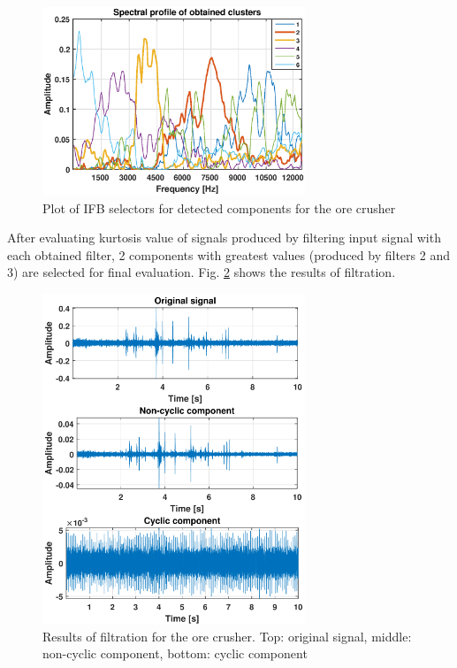 \documentclass[preprint,12pt]{elsarticle}
\begin{document}
\begin{figure}[!ht]
\centering
\includegraphics[width = 0.7\textwidth]{figs3/filt.eps}
\caption{Plot of IFB selectors for detected components for the ore crusher}
\label{fig: filt2}
\end{figure}

After evaluating kurtosis value of signals produced by filtering input signal with each obtained filter, 2 components with greatest values (produced by filters 2 and 3) are selected for final evaluation. Fig. \ref{fig: out2} shows the results of filtration. 

\begin{figure}[!ht]
\centering
\includegraphics[width = 0.7\textwidth]{figs3/out.png}
\caption{Results of filtration for the ore crusher. Top: original signal, middle: non-cyclic component, bottom: cyclic component}
\label{fig: out2}
\end{figure}
\end{document}

